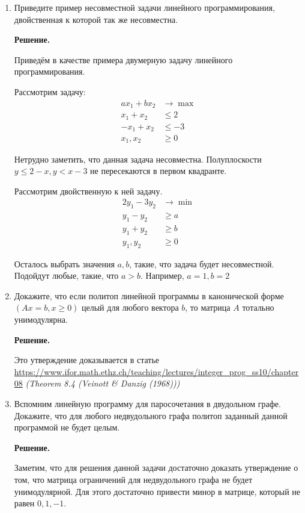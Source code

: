 \begin{enumerate}
	\item Приведите пример несовместной задачи линейного программирования, двойственная к которой так же 
	несовместна.
	
	\textbf{Решение.} 
	
	Приведём в качестве примера двумерную задачу линейного программирования.
	
	Рассмотрим задачу:
	\begin{align*}
		a x_1 + b x_2 &\to \max \\
		x_1 + x_2 &\leqslant 2 \\
		-x_1 + x_2 &\leqslant -3\\
		x_1, x_2 &\geqslant 0
	\end{align*}
	
	Нетрудно заметить, что данная задача несовместна. Полуплоскости $y \leqslant 2 - x, y < x - 3$ не пересекаются в первом квадранте.
	
	Рассмотрим двойственную к ней задачу.
	\begin{align*}
		2 y_1 - 3y_2 &\to \min\\
		y_1 - y_2 &\geqslant a \\
		y_1 + y_2 &\geqslant b \\
		y_1, y_2 &\geqslant 0
	\end{align*}
	
	Осталось выбрать значения $a,b$, такие, что задача будет несовместной. Подойдут любые, такие, что $a > b$. Например, $a = 1, b = 2$
	
	\item Докажите, что если политоп линейной программы в канонической форме $(Ax = b, x \geqslant 0)$ целый для 
	любого вектора $b$, то матрица $A$ тотально унимодулярна.
	
	\textbf{Решение.}
	
	Это утверждение доказывается в статье \url{https://www.ifor.math.ethz.ch/teaching/lectures/integer_prog_ss10/chapter08} \textit{(Theorem 8.4 (Veinott \& Danzig (1968)))}
	
	\item Вспомним линейную программу для паросочетания в двудольном графе. Докажите, что для любого 
	недвудольного графа политоп заданный данной программой не будет целым.
	
	\textbf{Решение.}
	
	Заметим, что для решения данной задачи достаточно доказать утверждение о том, что матрица ограничений для 
	недвудольного графа не будет унимодулярной. Для этого достаточно привести минор в матрице, который не равен 
	$0, 1, -1$.
	

\end{enumerate}
